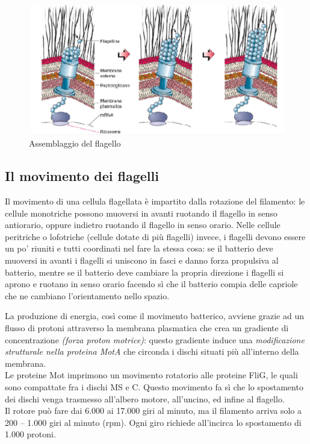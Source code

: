 \documentclass[11pt]{book}
\begin{document}
\begin{figure}[htp]
\centering
\includegraphics[scale=0.5]{img/Assemblaggio flagello.png}
\caption{Assemblaggio del flagello}
\label{}
\end{figure}

\clearpage
\subsection{Il movimento dei flagelli}

Il movimento di una cellula flagellata è impartito dalla rotazione del filamento: le cellule monotriche possono muoversi in avanti ruotando il flagello in senso antiorario, oppure indietro ruotando il flagello in senso orario. Nelle cellule peritriche o lofotriche (cellule dotate di più flagelli) invece, i flagelli devono essere un po’ riuniti e tutti coordinati nel fare la stessa cosa: se il batterio deve muoversi in avanti i flagelli si uniscono in fasci e danno forza propulsiva al batterio, mentre se il batterio deve cambiare la propria direzione i flagelli si aprono e ruotano in senso orario facendo sì che il batterio compia delle capriole che ne cambiano l’orientamento nello spazio.

\vspace{1em}
La produzione di energia, così come il movimento batterico, avviene grazie ad un flusso di protoni attraverso la membrana plasmatica che crea un gradiente di concentrazione \emph{(forza proton motrice)}: questo gradiente induce una \emph{modificazione strutturale nella proteina MotA} che circonda i dischi situati più all’interno della membrana.\\
Le proteine Mot imprimono un movimento rotatorio alle proteine FliG, le quali sono compattate fra i dischi MS e C. Questo movimento fa sì che lo spostamento dei dischi venga trasmesso all’albero motore, all’uncino, ed infine al flagello.\\
Il rotore può fare dai 6.000 ai 17.000 giri al minuto, ma il filamento arriva solo a 200 – 1.000 giri al minuto (rpm). Ogni giro richiede all’incirca lo spostamento di 1.000 protoni.
\end{document}
